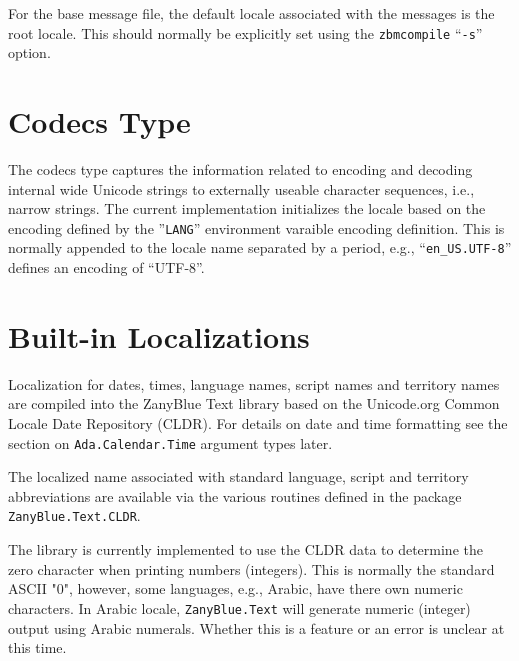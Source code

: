 For the base message file, the default locale associated with the messages
is the root locale.  This should normally be explicitly set using the
\texttt{zbmcompile} ``\texttt{-s}'' option.

\section{Codecs Type}

The codecs type captures the information related to encoding and decoding
internal wide Unicode strings to externally useable character sequences,
i.e., narrow strings.  The current implementation initializes the locale
based on the encoding defined by the ''\texttt{LANG}'' environment varaible
encoding definition.  This is normally appended to the locale name separated
by a period, e.g., ``\texttt{en\_US.UTF-8}'' defines an encoding of ``UTF-8''.

\section{Built-in Localizations}

Localization for dates, times, language names, script names and territory
names are compiled into the ZanyBlue Text library based on the Unicode.org
Common Locale Date Repository (CLDR).  For details on date and time formatting
see the section on \texttt{Ada.Calendar.Time} argument types later.

The localized name associated with standard language, script and territory
abbreviations are available via the various routines defined in the package
\texttt{ZanyBlue.Text.CLDR}.

The library is currently implemented to use the CLDR data to determine the
zero character when printing numbers (integers).  This is normally the
standard ASCII "0", however, some languages, e.g., Arabic, have there own
numeric characters.  In Arabic locale, \texttt{ZanyBlue.Text} will generate
numeric (integer) output using Arabic numerals.  Whether this is a feature
or an error is unclear at this time.

